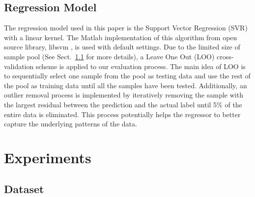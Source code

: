 \documentclass[conference]{IEEEtran}
\begin{document}
\subsection{Regression Model}
The regression model used in this paper is the Support Vector Regression (SVR) with a linear kernel. The Matlab implementation of this algorithm from open source library, libsvm \cite{Chang2011}, is used with default settings. Due to the limited size of sample pool (See Sect.~\ref{subsec:dataset} for more details), a Leave One Out (LOO) cross-validation scheme is applied to our evaluation process. The main idea of LOO is to sequentially select one sample from the pool as testing data and use the rest of the pool as training data until all the samples have been tested. Additionally, an outlier removal process is implemented by iteratively removing the sample with the largest residual between the prediction and the actual label until 5\% of the entire data is eliminated. This process potentially helps the regressor to better capture the underlying patterns of the data.  

\section{Experiments}\label{sec:experiments}
\subsection{Dataset}\label{subsec:dataset}
\end{document}
